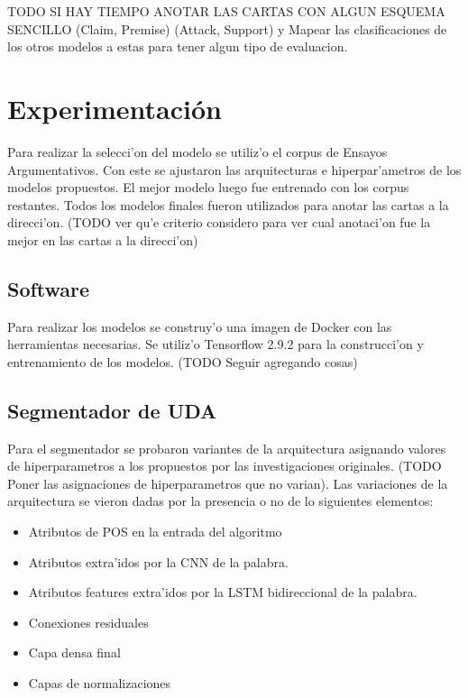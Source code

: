 TODO SI HAY TIEMPO ANOTAR LAS CARTAS CON ALGUN ESQUEMA SENCILLO (Claim, Premise) (Attack, Support) y Mapear 
las clasificaciones de los otros modelos a estas para tener algun tipo de evaluacion.

\section{Experimentación}

Para realizar la selecci'on del modelo se utiliz'o el corpus de Ensayos Argumentativos. Con este se ajustaron
las arquitecturas e hiperpar'ametros de los modelos propuestos. El mejor modelo luego fue entrenado con los
corpus restantes. Todos los modelos finales fueron utilizados para anotar las cartas a la direcci'on. (TODO ver 
qu'e criterio considero para ver cual anotaci'on fue la mejor en las cartas a la direcci'on)

\subsection{Software}

Para realizar los modelos se construy'o una imagen de Docker con las herramientas necesarias. Se utiliz'o 
Tensorflow 2.9.2 para la construcci'on y entrenamiento de los modelos. (TODO Seguir agregando cosas) 

\subsection{Segmentador de UDA}

Para el segmentador se probaron variantes de la arquitectura asignando valores de hiperparametros a los propuestos
por las investigaciones originales. (TODO Poner las asignaciones de hiperparametros que no varian). Las variaciones 
de la arquitectura se vieron dadas por la presencia o no de lo siguientes elementos:

\begin{itemize}
    \item Atributos de POS en la entrada del algoritmo
    \item Atributos extra'idos por la CNN de la palabra.
    \item Atributos features extra'idos por la LSTM bidireccional de la palabra.
    \item Conexiones residuales
    \item Capa densa final
    \item Capas de normalizaciones
\end{itemize}

